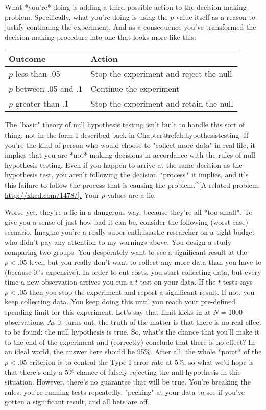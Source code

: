 What *you're* doing is adding a third possible action to the decision making problem. Specifically, what you're doing is using the $p$-value itself as a reason to justify continuing the experiment. And as a consequence you've transformed the decision-making procedure into one that looks more like this:


\begin{center}
\begin{tabular}{l|l}
Outcome & Action \\ \hline
$p$ less than .05 & Stop the experiment and reject the null \\
$p$ between .05 and .1 & Continue the experiment \\
$p$ greater than .1 & Stop the experiment and retain the null
\end{tabular}
\end{center}


The "basic" theory of null hypothesis testing isn't built to handle this sort of thing, not in the form I described back in Chapter@refch:hypothesistesting. If you're the kind of person who would choose to "collect more data" in real life, it implies that you are *not* making decisions in accordance with the rules of null hypothesis testing. Even if you happen to arrive at the same decision as the hypothesis test, you aren't following the decision *process* it implies, and it's this failure to follow the process that is causing the problem.^[A related problem: \url{http://xkcd.com/1478/].} Your $p$-values are a lie.

Worse yet, they're a lie in a dangerous way, because they're all *too small*. To give you a sense of just how bad it can be, consider the following (worst case) scenario. Imagine you're a really super-enthusiastic researcher on a tight budget who didn't pay any attention to my warnings above. You design a study comparing two groups. You desperately want to see a significant result at the $p<.05$ level, but you really don't want to collect any more data than you have to (because it's expensive). In order to cut costs, you start collecting data, but every time a new observation arrives you run a $t$-test on your data. If the $t$-tests says $p<.05$ then you stop the experiment and report a significant result. If not, you keep collecting data. You keep doing this until you reach your pre-defined spending limit for this experiment. Let's say that limit kicks in at $N=1000$ observations. As it turns out, the truth of the matter is that there is no real effect to be found: the null hypothesis is true. So, what's the chance that you'll make it to the end of the experiment and (correctly) conclude that there is no effect? In an ideal world, the answer here should be 95\%. After all, the whole *point* of the $p<.05$ criterion is to control the Type I error rate at 5\%, so what we'd hope is that there's only a 5\% chance of falsely rejecting the null hypothesis in this situation. However, there's no guarantee that will be true. You're breaking the rules: you're running tests repeatedly, "peeking" at your data to see if you've gotten a significant result, and all bets are off. 



